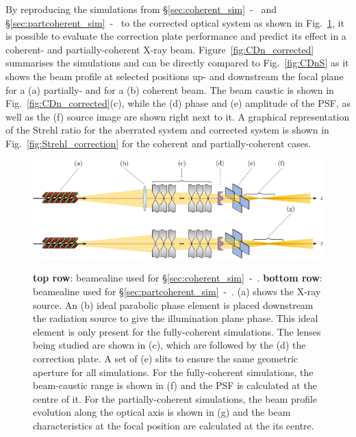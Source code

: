 \begin{refsection}
By reproducing the simulations from \S\ref{sec:coherent_sim}~-~\textit{} and \S\ref{sec:partcoherent_sim}~-~\textit{} to the corrected optical system as shown in Fig.~\ref{fig:optical_setups_corrected}, it is possible to evaluate the correction plate performance and predict its effect in a coherent- and partially-coherent X-ray beam. Figure~\ref{fig:CDn_corrected} summarises the simulations and can be directly compared to Fig.~\ref{fig:CDnS} as it
shows the beam profile at selected positions up- and downstream the focal plane for a (a) partially- and for a (b) coherent beam. The beam caustic is shown in Fig.~\ref{fig:CDn_corrected}(c), while the (d) phase and (e) amplitude of the PSF, as well as the (f) source image are shown right next to it. A graphical representation of the Strehl ratio for the aberrated system and corrected system is shown in Fig.~\ref{fig:Strehl_correction} for the coherent and partially-coherent cases.

\begin{figure}[t]
        \centering
        {\includegraphics[width=0.8\linewidth]{figures/ch06/optical_setups_corrected.pdf}}
        \caption[Beamlines for coherent- and partially-coherent simulations]{\textbf{top row}: beamealine used for  \S\ref{sec:coherent_sim}~-~\textit{}. \textbf{bottom row}: beamealine used for  \S\ref{sec:partcoherent_sim}~-~\textit{}. (a) shows the X-ray source. An (b) ideal parabolic phase element is placed downstream the radiation source to give the illumination plane phase. This ideal element is only present for the fully-coherent simulations. The lenses being studied are shown in (c), which are followed by the (d) the correction plate. A set of (e) slits to ensure the same geometric aperture for all simulations. For the fully-coherent simulations, the beam-caustic range is shown in (f) and the PSF is calculated at the centre of it. For the partially-coherent simulations, the beam profile evolution along the optical axis is shown in (g) and the beam characteristics at the focal position are calculated at the its centre. 
        }\label{fig:optical_setups_corrected}
\end{figure}


\end{refsection}

